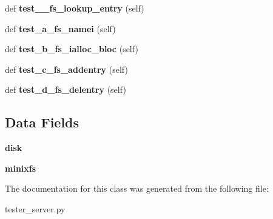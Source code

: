 \begin{DoxyCompactItemize}
\item 
\hypertarget{classtester__server_1_1_minix_tester_a439662ecb793a5fa39d2a81b82bc3844}{}def {\bfseries test\+\_\+\_\+fs\+\_\+lookup\+\_\+entry} (self)\label{classtester__server_1_1_minix_tester_a439662ecb793a5fa39d2a81b82bc3844}

\item 
\hypertarget{classtester__server_1_1_minix_tester_a2d40ca23d704b6a3dba89feaaa46ef4e}{}def {\bfseries test\+\_\+a\+\_\+fs\+\_\+namei} (self)\label{classtester__server_1_1_minix_tester_a2d40ca23d704b6a3dba89feaaa46ef4e}

\item 
\hypertarget{classtester__server_1_1_minix_tester_aff18c3a4f0015a9a7b9a077ee489a1c4}{}def {\bfseries test\+\_\+b\+\_\+fs\+\_\+ialloc\+\_\+bloc} (self)\label{classtester__server_1_1_minix_tester_aff18c3a4f0015a9a7b9a077ee489a1c4}

\item 
\hypertarget{classtester__server_1_1_minix_tester_a98f3830996534231f31445b8682a5cec}{}def {\bfseries test\+\_\+c\+\_\+fs\+\_\+addentry} (self)\label{classtester__server_1_1_minix_tester_a98f3830996534231f31445b8682a5cec}

\item 
\hypertarget{classtester__server_1_1_minix_tester_a098038e121b2415dbec422f5604bf94c}{}def {\bfseries test\+\_\+d\+\_\+fs\+\_\+delentry} (self)\label{classtester__server_1_1_minix_tester_a098038e121b2415dbec422f5604bf94c}

\end{DoxyCompactItemize}
\subsection*{Data Fields}
\begin{DoxyCompactItemize}
\item 
\hypertarget{classtester__server_1_1_minix_tester_a36c7b5664c44733896398e42189f7c6f}{}{\bfseries disk}\label{classtester__server_1_1_minix_tester_a36c7b5664c44733896398e42189f7c6f}

\item 
\hypertarget{classtester__server_1_1_minix_tester_afbd779c08c2307f759986f8ade741268}{}{\bfseries minixfs}\label{classtester__server_1_1_minix_tester_afbd779c08c2307f759986f8ade741268}

\end{DoxyCompactItemize}


The documentation for this class was generated from the following file\+:\begin{DoxyCompactItemize}
\item 
tester\+\_\+server.\+py\end{DoxyCompactItemize}
